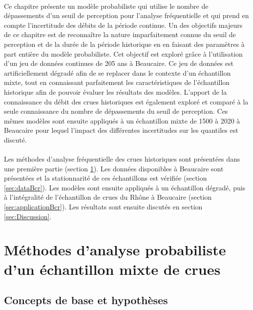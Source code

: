 	\paragraph{} Ce chapitre présente un modèle probabiliste qui utilise le nombre de dépassements d'un seuil de perception pour l'analyse fréquentielle et qui prend en compte l'incertitude des débits de la période continue. Un des objectifs majeurs de ce chapitre est de reconnaître la nature imparfaitement connue du seuil de perception et de la durée de la période historique en en faisant des paramètres à part entière 	du modèle probabiliste. Cet objectif est exploré grâce à l'utilisation d'un jeu de données continues de 205 ans à Beaucaire. Ce jeu de données est artificiellement dégradé afin de se replacer dans le contexte d'un échantillon mixte, tout en connaissant parfaitement les caractéristiques de l'échantillon historique afin de pouvoir évaluer les résultats des modèles. L'apport de la connaissance du débit des crues historiques est également exploré et comparé à la seule connaissance du nombre de dépassements du seuil de perception. Ces mêmes modèles sont ensuite appliqués à un échantillon mixte de 1500 à 2020 à Beaucaire pour lequel l'impact des différentes incertitudes sur les quantiles est discuté. 
	
	\paragraph{} Les méthodes d'analyse fréquentielle des crues historiques sont présentées dans une première partie (section \ref{sec:MethodoCh3}). Les données disponibles à Beaucaire sont présentées et la stationnarité de ces échantillons est vérifiée (section \ref{sec:dataBcr}). Les modèles sont ensuite appliqués à un échantillon dégradé, puis à l'intégralité de l'échantillon de crues du Rhône à Beaucaire (section \ref{sec:applicationBcr}). Les résultats sont ensuite discutés en section \ref{sec:Discussion}.	
		
		
\section{Méthodes d'analyse probabiliste d'un échantillon mixte de crues}
\label{sec:MethodoCh3}
	
	\subsection{Concepts de base et hypothèses}
	\label{subsec:conceptsdebase}
			
